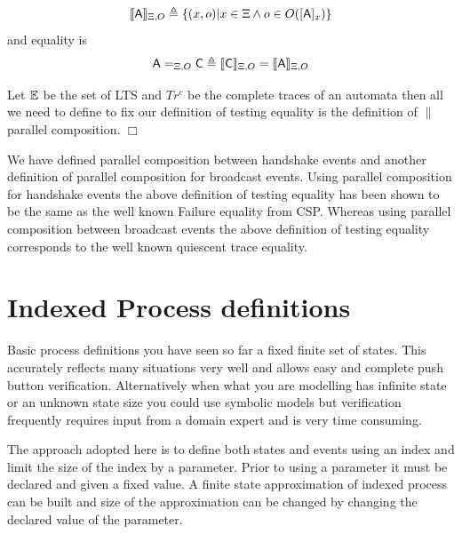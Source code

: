 \documentclass[]{article}
\begin{document}
\[
 \llbracket {\sf A}\rrbracket_{\Xi,O} \triangleq  \{(x,o) | x \in \Xi \wedge  o\in O([{\sf  A}]_x)\}
\]
and equality is
\[
{\sf A} =_{\Xi, O} {\sf  C} \triangleq   \llbracket {\sf C}\rrbracket_{\Xi,O} = \llbracket {\sf A}\rrbracket_{\Xi,O}
\]

Let $\mathbb E$ be the set of LTS and $Tr^c$ be the complete traces of an automata  then all we need to define to fix our definition of testing equality is the definition of $\parallel$ parallel composition.
\hspace{\fill}$\Box$

We have defined parallel composition between handshake events  and  another definition of parallel composition for broadcast events.  Using parallel composition for {\sf handshake events} the above definition of testing equality has been shown to be the same as the well known {\sf Failure equality} from CSP.  Whereas using parallel composition between {\sf broadcast events} the above definition of testing equality corresponds to the well known {\sf quiescent trace} equality.


\section{Indexed Process definitions}


Basic process definitions you have seen so far a fixed finite set of states. This accurately reflects  many situations very well and allows easy and complete push button verification. Alternatively when what you are modelling has infinite state or an unknown state size you could use symbolic models but verification  frequently requires  input from a domain expert and is very time consuming.

The approach adopted here is to define both states and events using an index and limit the size of the index by a parameter.  Prior to using a parameter it must be declared and given a fixed value. A finite state approximation of indexed process can be built and size of the approximation can be changed by changing the declared value of the parameter.
\end{document}
